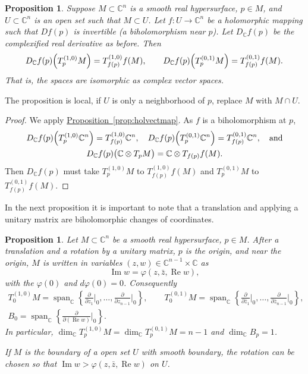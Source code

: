 \documentclass[12pt,openany]{book}
\renewcommand{\Re}{\operatorname{Re}}
\renewcommand{\Im}{\operatorname{Im}}
\newcommand{\C}{{\mathbb{C}}}
\theoremstyle{plain}
\newtheorem{prop}[thm]{Proposition}
\theoremstyle{remark}
\theoremstyle{definition}
\theoremstyle{exercise}
\theoremstyle{example}
\newcommand{\propref}[1]{\hyperref[#1]{Proposition~\ref*{#1}}}
\begin{document}
\begin{prop}
Suppose $M \subset \C^n$ is a smooth real hypersurface, $p \in M$,
and $U \subset \C^n$ is an open set such that $M \subset U$.
Let $f \colon U \to \C^n$ be a holomorphic mapping such
that $D f(p)$ is invertible (a biholomorphism near $p$).  Let $D_\C f(p)$ be
the complexified real derivative as before.  Then
\begin{equation*}
D_\C f(p)\Bigl(T_p^{(1,0)}M\Bigr) = T_{f(p)}^{(1,0)}f(M), \qquad
D_\C f(p)\Bigl(T_p^{(0,1)}M\Bigr) = T_{f(p)}^{(0,1)}f(M).
\end{equation*}
That is, the spaces are isomorphic as complex vector spaces.
\end{prop}

The proposition is local, if $U$ is only a neighborhood of $p$,
replace $M$ with $M \cap U$.

\begin{proof}
We apply \propref{prop:holvectmap}.
As $f$ is a biholomorphism at $p$,
\begin{multline*}
D_\C f(p)\Bigl(T_p^{(1,0)}\C^n\Bigr) = T_{f(p)}^{(1,0)}\C^n, \quad 
D_\C f(p)\Bigl(T_p^{(0,1)}\C^n\Bigr) = T_{f(p)}^{(0,1)}\C^n, \quad
\text{and} \\
D_\C f(p)\bigl(\C \otimes T_pM\bigr) =\C \otimes  T_{f(p)}f(M) .
\end{multline*}
Then $D_\C f(p)$ must take
$T_p^{(1,0)}M$ to $T_{f(p)}^{(1,0)}f(M)$ and
$T_p^{(0,1)}M$ to $T_{f(p)}^{(0,1)}f(M)$.
\end{proof}

In the next proposition it is important to note that a translation and
applying a unitary matrix are biholomorphic changes of coordinates.

\begin{prop} \label{prop:graphcoordinatesCn}
\pagebreak[2]
Let $M \subset \C^n$ be a smooth real hypersurface, $p \in M$.
After a translation and a rotation by a unitary
matrix, $p$ is the origin, and near the origin,
$M$ is written in variables $(z,w) \in \C^{n-1}
\times \C$ as
\begin{equation*}
\Im w = \varphi(z,\bar{z},\Re w) ,
\end{equation*}
with the $\varphi(0)$  and $d\varphi(0) = 0$.  Consequently
\begin{gather*}
T_0^{(1,0)} M
= \operatorname{span}_{\C} \left\{
\frac{\partial}{\partial z_1}\Big|_0,
\ldots,
\frac{\partial}{\partial z_{n-1}}\Big|_0 \right\} ,
\qquad
T_0^{(0,1)} M
= \operatorname{span}_{\C} \left\{
\frac{\partial}{\partial \bar{z}_1}\Big|_0,
\ldots,
\frac{\partial}{\partial \bar{z}_{n-1}}\Big|_0 \right\} ,
\\
B_0 = \operatorname{span}_{\C} \left\{
\frac{\partial}{\partial (\Re w)}\Big|_0 \right\} .
\end{gather*}
In particular,
$\dim_\C T_p^{(1,0)} M = \dim_\C T_p^{(0,1)} M = n-1$ and 
$\dim_\C B_p = 1$.

\nopagebreak
If $M$ is the boundary of a open set $U$ with smooth boundary,
the rotation can be chosen so that
$\Im w > \varphi(z,\bar{z},\Re w)$ on $U$.
\end{prop}
\end{document}

